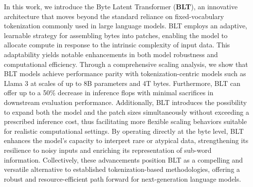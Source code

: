 In this work, we introduce the Byte Latent Transformer (\textbf{BLT}), an innovative architecture that moves beyond the standard reliance on fixed-vocabulary tokenization commonly used in large language models. {\textsc BLT} employs an adaptive, learnable strategy for assembling bytes into patches, enabling the model to allocate compute in response to the intrinsic complexity of input data. This adaptability yields notable enhancements in both model robustness and computational efficiency. Through a comprehensive scaling analysis, we show that {\textsc BLT} models achieve performance parity with tokenization-centric models such as Llama 3 at scales of up to 8B parameters and 4T bytes. Furthermore, BLT can offer up to a 50\% decrease in inference flops with minimal sacrifices in downstream evaluation performance. Additionally, {\textsc BLT} introduces the possibility to expand both the model and the patch sizes simultaneously without exceeding a prescribed inference cost, thus facilitating more flexible scaling behaviors suitable for realistic computational settings. By operating directly at the byte level, {\textsc BLT} enhances the model’s capacity to interpret rare or atypical data, strengthening its resilience to noisy inputs and enriching its representation of sub-word information. Collectively, these advancements position {\textsc BLT} as a compelling and versatile alternative to established tokenization-based methodologies, offering a robust and resource-efficient path forward for next-generation language models.

